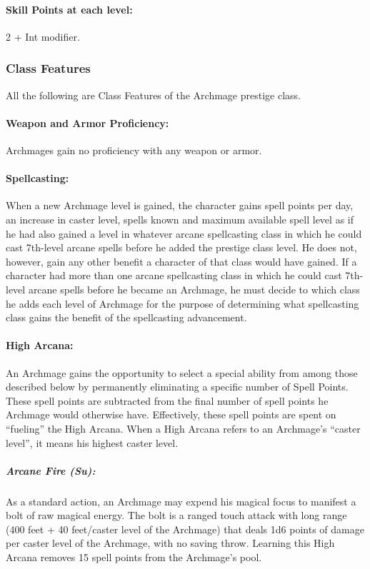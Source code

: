 \paragraph{Skill Points at each level:} 2 + Int modifier.


\subsubsection{Class Features}
All the following are Class Features of the Archmage prestige class.

\paragraph{Weapon and Armor Proficiency:} Archmages gain no proficiency with any weapon or armor.

\paragraph{Spellcasting:} When a new Archmage level is gained, the character gains spell points per day, an increase in caster level, spells known and maximum available spell level as if he had also gained a level in whatever arcane spellcasting class in which he could cast 7th-level arcane spells before he added the prestige class level. 
He does not, however, gain any other benefit a character of that class would have gained. 
If a character had more than one arcane spellcasting class in which he could cast 7th-level arcane spells before he became an Archmage, he must decide to which class he adds each level of Archmage for the purpose of determining what spellcasting class gains the benefit of the spellcasting advancement.

\paragraph{High Arcana:}
An Archmage gains the opportunity to select a special ability from among those described below by permanently eliminating a specific number of Spell Points.
These spell points are subtracted from the final number of spell points he Archmage would otherwise have.
Effectively, these spell points are spent on ``fueling'' the High Arcana.
When a High Arcana refers to an Archmage's ``caster level'', it means his highest caster level.

\subparagraph{Arcane Fire (Su):}
As a standard action, an Archmage may expend his magical focus to manifest a bolt of raw magical energy. 
The bolt is a ranged touch attack with long range (400 feet + 40 feet/caster level of the Archmage) 
that deals 1d6 points of damage per caster level of the Archmage, with no saving throw. 
Learning this High Arcana removes 15 spell points from the Archmage's pool.

